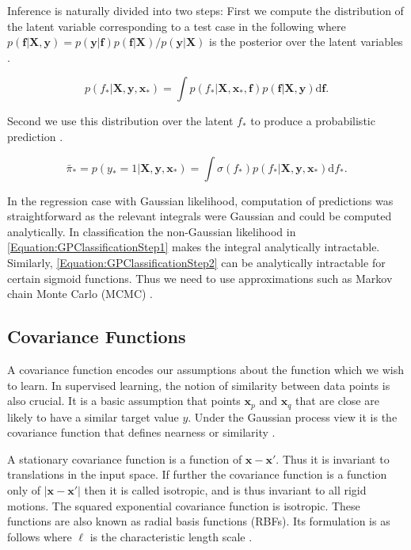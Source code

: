 \documentclass[../../../main.tex]{subfiles}
\begin{document}
Inference is naturally divided into two steps: First we compute the distribution of the latent variable corresponding to a test case in the following where $p(\bm{f}|\bm{X},\bm{y})=p(\bm{y}|\bm{f})p(\bm{f}|\bm{X})/p(\bm{y}|\bm{X})$ is the posterior over the latent variables \autocite{Rasmussen2005}.

\begin{equation}
p(f_\ast|\bm{X},\bm{y},\bm{x}_\ast) = \int p(f_\ast|\bm{X},\bm{x}_\ast,\bm{f})p(\bm{f}|\bm{X},\bm{y})\mathrm{d}\bm{f}.
\label{Equation:GPClassificationStep1}
\end{equation}

Second we use this distribution over the latent $f_\ast$ to produce a probabilistic prediction \autocite{Rasmussen2005}.

\begin{equation}
\bar{\pi}_\ast = p(y_\ast=1|\bm{X},\bm{y},\bm{x}_\ast) = \int \sigma(f_\ast)p(f_\ast|\bm{X},\bm{y},\bm{x}_\ast)\mathrm{d}f_\ast.
\label{Equation:GPClassificationStep2}
\end{equation}

In the regression case with Gaussian likelihood, computation of predictions was straightforward as the relevant integrals were Gaussian and could be computed analytically. In classification the non-Gaussian likelihood in \autoref{Equation:GPClassificationStep1} makes the integral analytically intractable. Similarly, \autoref{Equation:GPClassificationStep2} can be analytically intractable for certain sigmoid functions. Thus we need to use approximations such as Markov chain Monte Carlo (MCMC) \autocite{Rasmussen2005}.

\subsection{Covariance Functions}

A covariance function encodes our assumptions about the function which we wish to learn. In supervised learning, the notion of similarity between data points is also crucial. It is a basic assumption that points $\bm{x}_p$ and $\bm{x}_q$ that are close are likely to have a similar target value $y$. Under the Gaussian process view it is the covariance function that defines nearness or similarity \autocite{Rasmussen2005}.

A stationary covariance function is a function of $\bm{x}-\bm{x}'$. Thus it is invariant to translations in the input space. If further the covariance function is a function only of $|\bm{x}-\bm{x}'|$ then it is called isotropic, and is thus invariant to all rigid motions. The squared exponential covariance function is isotropic. These functions are also known as radial basis functions (RBFs). Its formulation is as follows where $\ell$ is the characteristic length scale \autocite{Rasmussen2005}.
\end{document}
